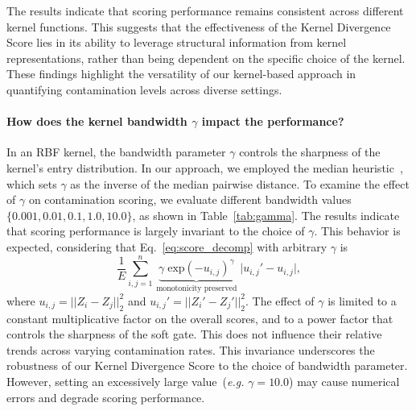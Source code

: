 The results indicate that scoring performance remains consistent across different kernel functions. 
This suggests that the effectiveness of the Kernel Divergence Score lies in its ability to leverage structural information from kernel representations, rather than being dependent on the specific choice of the kernel. 
These findings highlight the versatility of our kernel-based approach in quantifying contamination levels across diverse settings.




\paragraph{How does the kernel bandwidth $\gamma$ impact the performance?} 
In an RBF kernel, the bandwidth parameter $\gamma$ controls the sharpness of the kernel's entry distribution.
In our approach, we employed the median  heuristic~\cite{garreau2017large}, which sets $\gamma$ as the inverse of the median pairwise distance.
To examine the effect of $\gamma$ on contamination scoring,  we evaluate different bandwidth values $\{0.001, 0.01, 0.1, 1.0, 10.0\}$, as shown in Table~\ref{tab:gamma}.
The results indicate that scoring performance is largely invariant to the choice of $\gamma$.
This behavior is expected, considering that Eq.~\eqref{eq:score_decomp} with arbitrary $\gamma$ is 
\begin{equation}
    \frac{1}{E} \sum_{i,j=1}^n \, \underbrace{\gamma \;\text{exp}(-u_{i,j})^\gamma}_{\text{monotonicity preserved}} \; \big\vert u_{i,j}' - u_{i,j} \big\vert,
\end{equation}
where $u_{i,j} = ||Z_i - Z_j||_2^2$ and $u_{i,j}' = ||Z_i' - Z_j'||_2^2$.
The effect of $\gamma$ is limited to a constant multiplicative factor on the overall scores, and to a power factor that controls the sharpness of the soft gate.
This does not influence their relative trends across varying contamination rates.
This invariance underscores the robustness of our Kernel Divergence Score to the choice of bandwidth parameter.
However, setting an excessively large  value~(\textit{e.g.} $\gamma = 10.0$) may cause numerical errors and degrade scoring performance.




